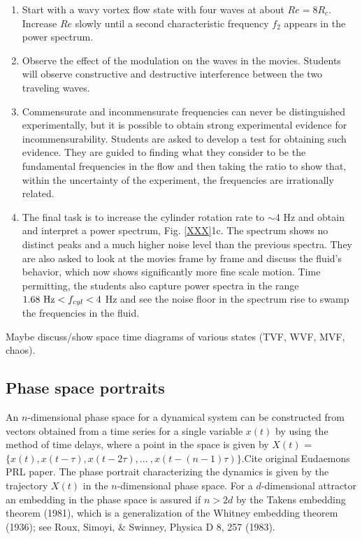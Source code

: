 \documentclass[%
reprint,
 amsmath,amssymb,
 aps,
prb,
floatfix,
longbibliography,
notitlepage
]{revtex4-1}
\newcommand{\DB}[1]{{\color{red}#1}} %
\newcommand{\ReN}{\ensuremath{Re}} %
\begin{document}
\begin{enumerate}
\begin{enumerate}
\item  Start with a wavy vortex flow state with four waves at about $\ReN=8R_c$.  Increase $\ReN$ slowly until a second characteristic frequency $f_2$ appears in the power spectrum.  
\item  Observe the effect of the modulation on the waves in the movies. Students will observe constructive and destructive interference between the two traveling waves.
\item  Commensurate and incommensurate frequencies can never be distinguished experimentally, but it is possible to obtain strong experimental evidence for incommensurability.  Students are asked to develop a test for obtaining such evidence. They are guided to finding what they consider to be the fundamental frequencies in the flow and then taking the ratio to show that, within the uncertainty of the experiment, the frequencies are irrationally related.
\item The final task is to increase the cylinder rotation rate to $\sim$4 Hz and obtain and interpret a power spectrum, Fig. \ref{XXX}1c.  The spectrum shows no distinct peaks and a much higher noise level than the previous spectra. They are also asked to look at the movies frame by frame and discuss the fluid's behavior, which now shows significantly more fine scale motion. Time permitting, the students  also capture power spectra in the range $1.68 {\rm ~Hz} <f_{cyl}<4$ Hz and see the noise floor in the spectrum rise to swamp the frequencies in the fluid.
\end{enumerate}
\end{enumerate}

\DB{Maybe discuss/show space time diagrams of various states (TVF, WVF, MVF, chaos).}

\subsection{Phase space portraits}

An $n$-dimensional phase space for a dynamical system can be constructed from vectors obtained from a time series for a single variable $x(t)$ by using the method of time delays, where a point in the space is given by $X(t)$ = $\{x(t), x(t-\tau), x(t-2\tau), ...  \ , x(t-(n-1)\tau)\}$.\DB{Cite original Eudaemons PRL paper}. The phase portrait characterizing the dynamics is given by the trajectory $X(t)$ in the $n$-dimensional phase space.  For a $d$-dimensional attractor an embedding in the phase space is assured if $n > 2d$ by the Takens embedding theorem (1981), which is a generalization of the Whitney embedding theorem (1936); see Roux, Simoyi, $\&$ Swinney, Physica D 8, 257 (1983).
\end{document}
